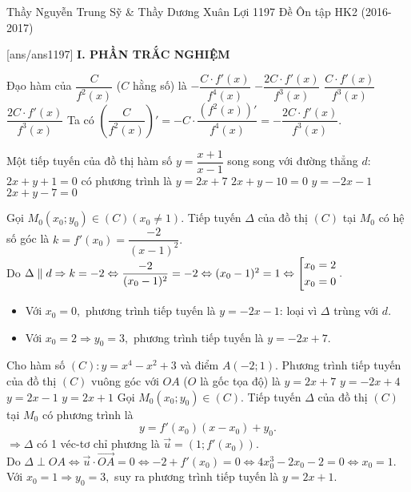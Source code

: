 \begin{name}
{Thầy Nguyễn Trung Sỹ \& Thầy Dương Xuân Lợi }
{1197 Đề Ôn tập HK2 (2016-2017)}%
	\end{name}
	\setcounter{ex}{0}\setcounter{bt}{0}
	[ans/ans1197]
\noindent\textbf{I. PHẦN TRẮC NGHIỆM}
\begin{ex}%
	Đạo hàm của $\dfrac{C}{f^2(x)} $ ($C$ hằng số) là
	\choice
	{ $- \dfrac{C\cdot f'(x)}{f^4(x)}$}
	{\True $- \dfrac{2C\cdot f'(x)}{f^3(x)}$}
	{ $\dfrac{C\cdot f'(x)}{f^3(x)}$}
	{$\dfrac{2C\cdot f'(x)}{f^3(x)}$}
	\loigiai
	{ Ta có $\left(\dfrac{C}{f^2(x)} \right)' = - C\cdot \dfrac{\left( f^2(x)\right)'}{f^4(x)}= - \dfrac{2C\cdot f'(x)}{f^3(x)}.$
	}
\end{ex}
\begin{ex}%
	Một tiếp tuyến của đồ thị hàm số $ y=\dfrac{x+1}{x-1}$ song song với đường thẳng $d$: $2x+y+1=0$ có phương trình là
	\choice
	{$y=2x+7$}
	{$2x+y-10=0$}
	{$y=-2x-1$}
	{\True $2x+y-7=0$}
	\loigiai
	{ Gọi $M_0(x_0;y_0) \in (C) (x_0 \neq 1)$. Tiếp tuyến $ \Delta $ của đồ thị $(C)$ tại $M_0$ có hệ số góc là $k =f'(x_0)= \dfrac{-2}{(x-1)^2}.$\\
		Do $ \Delta \parallel d \Rightarrow  k= -2 \Leftrightarrow \dfrac{-2}{(x_0-1)^2}=-2 \Leftrightarrow (x_0-1)^2=1 \Leftrightarrow \left[\begin{aligned}& x_0=2\\&x_0=0\end{aligned}\right..$\\
		\begin{itemize}
			\item Với $x_0=0,$ phương trình tiếp tuyến là $y=-2x-1$: loại vì $\Delta$ trùng với $d$.
			\item Với $x_0 =2 \Rightarrow y_0=3,$ phương trình tiếp tuyến là $y=-2x +7.$
		\end{itemize}
		
	}
\end{ex}
\begin{ex}%
	Cho hàm số $(C): y=x^4-x^2+3$ và điểm $A(-2;1)$. Phương trình tiếp tuyến của đồ thị $(C)$ vuông góc với $OA$ ($O$ là gốc tọa độ) là
	\choice
	{$y=2x+7$}
	{$y=-2x+4$}
	{$y=2x-1$}
	{\True $y=2x+1$}
	\loigiai
	{ 	 Gọi $M_0(x_0;y_0) \in (C) $. Tiếp tuyến $ \Delta $ của đồ thị $(C)$ tại $M_0$ có phương trình là $$y =f'(x_0)(x-x_0)+y_0.$$ $\Rightarrow \Delta $ có 1 véc-tơ chỉ phương là $\vec{u}=\left( 1; f'(x_0)\right).$\\
		Do $\Delta \perp OA \Leftrightarrow \vec{u}\cdot \vec{OA} =0  \Leftrightarrow -2+f'(x_0)=0 \Leftrightarrow 4x_0^3-2x_0 -2=0 \Leftrightarrow x_0=1.$\\
		Với $x_0=1 \Rightarrow y_0=3,$ suy ra phương trình tiếp tuyến là $y=2x+1.$
	}
\end{ex}
